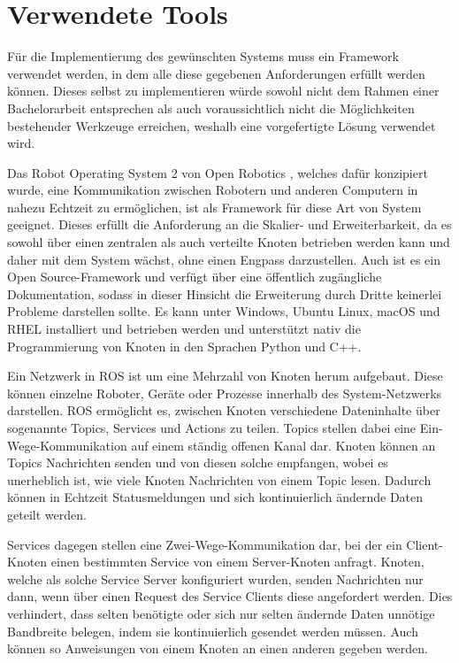 \section{Verwendete Tools}

Für die Implementierung des gewünschten Systems muss ein Framework verwendet werden, in dem alle diese gegebenen Anforderungen erfüllt werden können. Dieses selbst zu implementieren würde sowohl nicht dem Rahmen einer Bachelorarbeit entsprechen als auch voraussichtlich nicht die Möglichkeiten bestehender Werkzeuge erreichen, weshalb eine vorgefertigte Lösung verwendet wird.

Das Robot Operating System 2 von Open Robotics \cite{ros}, welches dafür konzipiert wurde, eine Kommunikation zwischen Robotern und anderen Computern in nahezu Echtzeit zu ermöglichen, ist als Framework für diese Art von System geeignet. Dieses erfüllt die Anforderung an die Skalier- und Erweiterbarkeit, da es sowohl über einen zentralen als auch verteilte Knoten betrieben werden kann und daher mit dem System wächst, ohne einen Engpass darzustellen. Auch ist es ein Open Source-Framework und verfügt über eine öffentlich zugängliche Dokumentation, sodass in dieser Hinsicht die Erweiterung durch Dritte keinerlei Probleme darstellen sollte. Es kann unter Windows, Ubuntu Linux, macOS und RHEL installiert und betrieben werden und unterstützt nativ die Programmierung von Knoten in den Sprachen Python und C++.

Ein Netzwerk in ROS ist um eine Mehrzahl von Knoten herum aufgebaut. Diese können einzelne Roboter, Geräte oder Prozesse innerhalb des System-Netzwerks darstellen. ROS ermöglicht es, zwischen Knoten verschiedene Dateninhalte über sogenannte Topics, Services und Actions zu teilen. Topics stellen dabei eine Ein-Wege-Kommunikation auf einem ständig offenen Kanal dar. Knoten können an Topics Nachrichten senden und von diesen solche empfangen, wobei es unerheblich ist, wie viele Knoten Nachrichten von einem Topic lesen. Dadurch können in Echtzeit Statusmeldungen und sich kontinuierlich ändernde Daten geteilt werden.

Services dagegen stellen eine Zwei-Wege-Kommunikation dar, bei der ein Client-Knoten einen bestimmten Service von einem Server-Knoten anfragt. Knoten, welche als solche Service Server konfiguriert wurden, senden Nachrichten nur dann, wenn über einen Request des Service Clients diese angefordert werden. Dies verhindert, dass selten benötigte oder sich nur selten ändernde Daten unnötige Bandbreite belegen, indem sie kontinuierlich gesendet werden müssen. Auch können so Anweisungen von einem Knoten an einen anderen gegeben werden.

